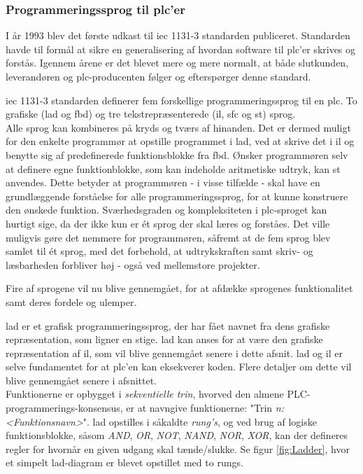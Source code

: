 \subsubsection{Programmeringssprog til \gls{plc}'er}
\noindent I år 1993 blev det første udkast til \gls{iec} 1131-3 standarden publiceret\cite{iecStandard}. Standarden havde til formål at sikre en generalisering af hvordan software til \gls{plc}'er skrives og forstås. Igennem årene er det blevet mere og mere normalt, at både slutkunden, leverandøren og \gls{plc}-producenten følger og efterspørger denne standard. 

\noindent \gls{iec} 1131-3 standarden definerer fem forskellige programmeringssprog til en \gls{plc}. 
To grafiske (\gls{lad} og \gls{fbd}) og tre tekstrepræsenterede (\gls{il}, \gls{sfc} og \gls{st}) sprog. \\
\noindent Alle sprog kan kombineres på kryds og tværs af hinanden. Det er dermed muligt for den enkelte programmør at opstille programmet i \gls{lad}, ved at skrive det i \gls{il} og benytte sig af predefinerede funktionsblokke fra \gls{fbd}. Ønsker programmøren selv at definere egne funktionblokke, som kan indeholde aritmetiske udtryk, kan \gls{st} anvendes. Dette betyder at programmøren - i visse tilfælde - skal have en grundlæggende forståelse for alle programmeringssprog, for at kunne konstruere den ønskede funktion. Sværhedsgraden og kompleksiteten i \gls{plc}-sproget kan hurtigt sige, da der ikke kun er ét sprog der skal læres og forståes. Det ville muligvis gøre det nemmere for programmøren, såfremt at de fem sprog blev samlet til ét sprog, med det forbehold, at udtrykskraften samt skriv- og læsbarheden forbliver høj - også ved mellemstore projekter.

\noindent Fire af sprogene vil nu blive gennemgået, for at afdække sprogenes funktionalitet samt deres fordele og ulemper. 

\label{subsec:lad}
\gls{lad} er et grafisk programmeringssprog, der har fået navnet fra dens grafiske repræsentation, som ligner en stige. \gls{lad} kan anses for at være den grafiske repræsentation af \gls{il}, som vil blive gennemgået senere i dette afsnit. \gls{lad} og \gls{il} er selve fundamentet for at \gls{plc}'en kan eksekverer koden. Flere detaljer om dette vil blive gennemgået senere i afsnittet.\\

\noindent Funktionerne er opbygget i \textit{sekventielle trin}, hvorved den almene PLC-programmerings-konsensus, er at navngive funktionerne: "Trin \textit{n: <Funktionsnavn>}".  
\gls{lad} opstilles i såkaldte \textit{rung's}, og ved brug af logiske funktionsblokke, såsom \textit{AND}, \textit{OR}, \textit{NOT}, \textit{NAND}, \textit{NOR}, \textit{XOR}, kan der defineres regler for hvornår en given udgang skal tænde/slukke. Se figur \ref{fig:Ladder}, hvor et simpelt \gls{lad}-diagram er blevet opstillet med to rungs.\\

